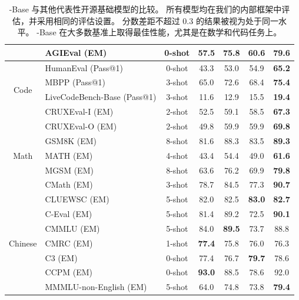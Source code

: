 \begin{table}[!ht]
\begin{tabular}{@{}c l c | c | c c | c@{}}
    & AGIEval {\tiny (EM)} & 0-shot & 57.5 & 75.8 & 60.6 & \textbf{79.6} \\
    \midrule
    \multirow{4}{*}{Code} & HumanEval {\tiny (Pass@1)} & 0-shot & 43.3 & 53.0 & 54.9 & \textbf{65.2} \\
    & MBPP {\tiny (Pass@1)} & 3-shot & 65.0 & 72.6 & 68.4 & \textbf{75.4} \\
    & LiveCodeBench-Base {\tiny (Pass@1)} & 3-shot & 11.6 & 12.9 & 15.5 & \textbf{19.4} \\
    & CRUXEval-I {\tiny (EM)} & 2-shot & 52.5 & 59.1 & 58.5 & \textbf{67.3} \\
    & CRUXEval-O {\tiny (EM)} & 2-shot & 49.8 & 59.9 & 59.9 & \textbf{69.8} \\
    \midrule
    \multirow{3}{*}{Math} & GSM8K {\tiny (EM)} & 8-shot & 81.6 & 88.3 & 83.5 & \textbf{89.3} \\
    & MATH {\tiny (EM)} & 4-shot & 43.4 & 54.4 & 49.0 & \textbf{61.6} \\
    & MGSM {\tiny (EM)} & 8-shot & 63.6 & 76.2 & 69.9 & \textbf{79.8} \\
    & CMath {\tiny (EM)} & 3-shot & 78.7 & 84.5 & 77.3 & \textbf{90.7} \\
    \midrule
    \multirow{7}{*}{Chinese} & CLUEWSC {\tiny (EM)} & 5-shot & 82.0 & 82.5 & \textbf{83.0} & \textbf{82.7} \\
    & C-Eval {\tiny (EM)} & 5-shot & 81.4 & 89.2 & 72.5 & \textbf{90.1} \\
    & CMMLU {\tiny (EM)} & 5-shot & 84.0 & \textbf{89.5} & 73.7 & 88.8 \\
    & CMRC {\tiny (EM)} & 1-shot & \textbf{77.4} & 75.8 & 76.0 & 76.3 \\
    & C3 {\tiny (EM)} & 0-shot & 77.4 & 76.7 & \textbf{79.7} & 78.6 \\
    & CCPM {\tiny (EM)} & 0-shot & \textbf{93.0} & 88.5 & 78.6 & 92.0 \\
    \midrule
    \multirow{1}{*}{Multilingual} & MMMLU-non-English {\tiny (EM)} & 5-shot & 64.0 & 74.8 & 73.8 & \textbf{79.4} \\
    \bottomrule
    \end{tabular}
    \caption{
        \dsviii{}-Base 与其他代表性开源基础模型的比较。
        所有模型均在我们的内部框架中评估，并采用相同的评估设置。
        分数差距不超过 0.3 的结果被视为处于同一水平。
        \dsviii{}-Base 在大多数基准上取得最佳性能，尤其是在数学和代码任务上。
    }
    \label{tab:main}
\end{table}
